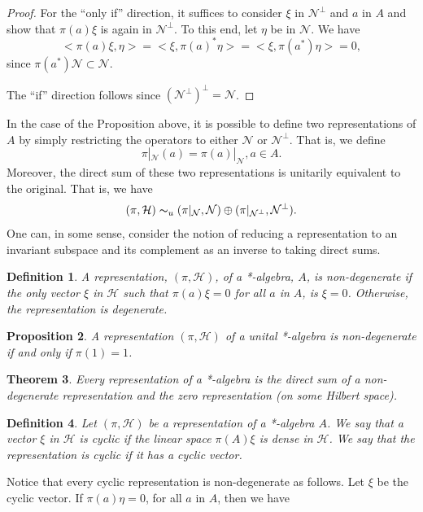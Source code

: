 \documentclass{book}
\newtheorem{definition}{Definition}[section]
\newtheorem{proposition}[definition]{Proposition}
\newtheorem{theorem}[definition]{Theorem}
\begin{document}
\begin{proof}
  For the ``only if'' direction, it suffices to consider \(\xi\) in \(\mathcal{N}^\bot\) and \(a\) in \(A\)
  and show that \(\pi(a)\xi\) is again in \(\mathcal{N}^\bot\). To this end, let \(\eta\) be in \(\mathcal{N}\). We have
  \[<\pi(a)\xi,\eta >=< \xi,{\pi(a)}^*\eta >=< \xi,\pi(a^*)\eta >= 0,\]
  since \(\pi(a^*)\mathcal{N} \subset \mathcal{N}\).\par
  The ``if'' direction follows since \({(\mathcal{N}^\bot)}^\bot = \mathcal{N}\).
\end{proof}
In the case of the Proposition above, it is possible to define two 
representations of \(A\) by simply restricting the operators to either \(\mathcal{N}\) or \(\mathcal{N}^\bot\). That is,
we define
\[\pi|_{\mathcal{N}}(a) = \pi(a)|_\mathcal{N},a \in A.\]
Moreover, the direct sum of these two representations is unitarily equivalent
to the original. That is, we have
\[(\pi, \mathcal{H}) \thicksim_u (\pi|_\mathcal{N},\mathcal{N})\oplus(\pi|_{\mathcal{N}^\bot},\mathcal{N}^\bot).\]
One can, in some sense, consider the notion of reducing a representation to
an invariant subspace and its complement as an inverse to taking direct sums.
\begin{definition}
  A representation, \((\pi,\mathcal{H})\), of a *-algebra, \(A\), is \textnormal{non-degenerate} 
  if the only vector \(\xi\) in \(\mathcal{H}\) such that \(\pi(a)\xi = 0\) for all \(a\) in \(A\),
  is \(\xi = 0\). Otherwise, the representation is \textnormal{degenerate}.
\end{definition}
\begin{proposition}
  A representation \((\pi,\mathcal{H})\) of a unital *-algebra is 
  non-degenerate if and only if \(\pi(1) = 1\).
\end{proposition}
\begin{theorem}
  Every representation of a *-algebra is the direct sum of a
  non-degenerate representation and the zero representation (on some Hilbert
  space).
\end{theorem}
\begin{definition}
  Let \((\pi,\mathcal{H})\) be a representation of a *-algebra \(A\). We say
  that a vector \(\xi\) in \(\mathcal{H}\) is \textnormal{cyclic} if the linear space \(\pi(A)\xi\) is dense in \(\mathcal{H}\). We
  say that the representation is cyclic if it has a cyclic vector.
\end{definition}
Notice that every cyclic representation is non-degenerate as follows. Let
\(\xi\) be the cyclic vector. If \(\pi(a)\eta = 0\), for all \(a\) in \(A\), then we have
\end{document}
